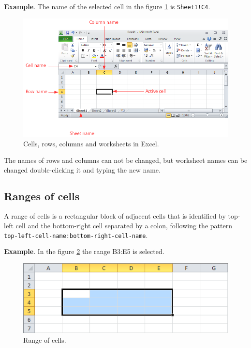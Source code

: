 \textbf{Example}. The name of the selected cell in the figure \ref{img-sheet_column_row_cell} is \texttt{Sheet1!C4}.

\begin{figure}[htbp]
\begin{center}
\includegraphics[max width=\linewidth]{../img/sheet_column_row_cell.png}
\end{center}
\caption{Cells, rows, columns and worksheets in Excel.}
\label{img-sheet_column_row_cell}
\end{figure}

The names of rows and columns can not be changed, but worksheet names can be changed double-clicking it and typing the new name.

\subsection{Ranges of cells}\hypertarget{ranges-of-cells}{}\label{ranges-of-cells}

A range of cells is a rectangular block of adjacent cells that is identified by top-left cell and the bottom-right cell separated by a colon, following the pattern \texttt{top-left-cell-name:bottom-right-cell-name}.

\textbf{Example}. In the figure \ref{img-cells_range} the range B3:E5 is selected.

\begin{figure}[htbp]
\begin{center}
\includegraphics[max width=\linewidth]{../img/cells_range.png}
\end{center}
\caption{Range of cells.}
\label{img-cells_range}
\end{figure}

